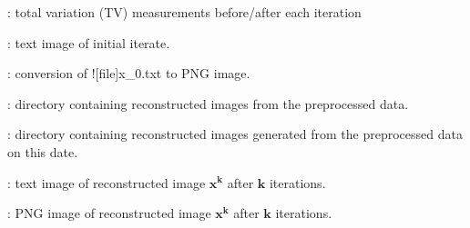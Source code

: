 \begin{tcbenvironment}
\begin{tcbenumbox}
\begin{ThinEnum}
\begin{ThinEnum}
\begin{ThinEnum}
\begin{ThinEnum}
\begin{ThinEnum}
\begin{ThinEnum}
\begin{ThinEnum}
\begin{ThinEnum}
\begin{ThinEnum}
                                            \item {} : total variation (TV) measurements before/after each iteration
                                            \item {} : text image of initial iterate.
                                            \item {} : conversion of \docentry![file]{x\_0.txt} to PNG image.
                                            \item {} : directory containing reconstructed images from the preprocessed data.
                                            \begin{ThinEnum}
                                            \item {} : directory containing reconstructed images generated from the preprocessed data on this date.
                                                \begin{ThinEnum}
                                                    \item {} : text image of reconstructed image $\boldsymbol{x^k}$ after $\boldsymbol{k}$ iterations.
                                                    \item {} : PNG image of reconstructed image $\boldsymbol{x^k}$ after $\boldsymbol{k}$ iterations.
                                                \end{ThinEnum}%
                                        \end{ThinEnum}%
                                    \end{ThinEnum}%
                                \end{ThinEnum}%
                            \end{ThinEnum}%
                        \end{ThinEnum}%
                    \end{ThinEnum}%
                \end{ThinEnum}%
            \end{ThinEnum}%
        \end{ThinEnum}%
    \end{ThinEnum}%
\end{tcbenumbox}
\end{tcbenvironment}
\endinput
